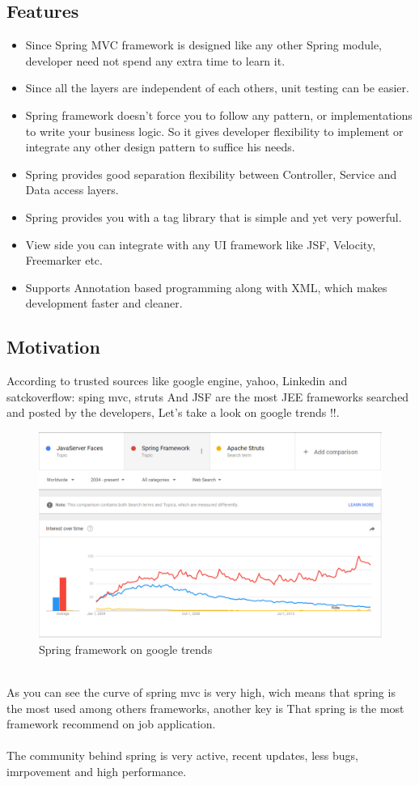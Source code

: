 \documentclass[12pt]{article}
\begin{document}
\subsection{Features}
\begin{itemize}
	\item Since Spring MVC framework is designed like any other Spring module, developer need not spend any extra time to learn it.
	\item Since all the layers are independent of each others, unit testing can be easier.
	\item Spring framework doesn’t force you to follow any pattern, or implementations to write your business logic. So it gives developer flexibility to implement or integrate any other design pattern to suffice his needs.
	\item Spring provides good separation flexibility between Controller, Service and Data access layers.
	\item Spring provides you with a tag library that is simple and yet very powerful.
	\item View side you can integrate with any UI framework like JSF, Velocity, Freemarker etc.
	\item Supports Annotation based programming along with XML, which makes development faster and cleaner.
\end{itemize} 
\subsection{Motivation}
According to trusted sources like google engine, yahoo, Linkedin and satckoverflow: sping mvc, struts And JSF are the most JEE frameworks searched and posted by the developers, Let's take a look on google trends !!.\\
\begin{figure}[h]
	\centering
	\includegraphics[width=1.0\textwidth]{SpringMVC_statics_google_trends.png}
	\caption{Spring framework on google trends}
\end{figure}
\\
As you can see the curve of spring mvc is very high, wich means that spring is the most used among others frameworks, another key is That spring is the most framework recommend on job application.
\\
\\
The community behind spring is very active, recent updates, less bugs, imrpovement and high performance.
\end{document}
